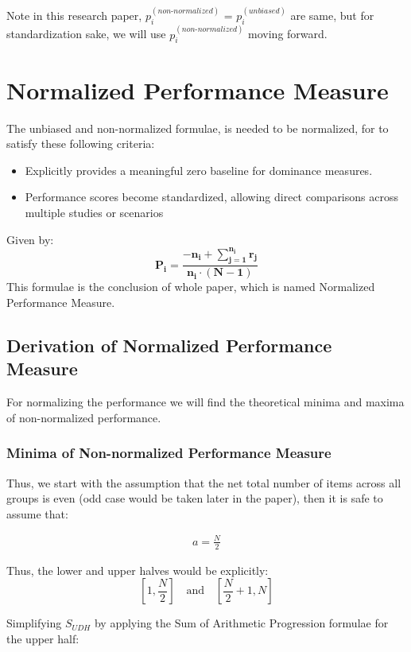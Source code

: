 \documentclass[a4paper,fleqn,review]{cas-sc}
\begin{document}
Note in this research paper, $p_i^{(non\text{-}normalized)}$ = $p_i^{(unbiased)}$ are same, but for standardization sake, we will use $p_i^{(non\text{-}normalized)}$ moving forward.

\section{Normalized Performance Measure}

The unbiased and non-normalized formulae, is needed to be normalized, for to satisfy these following criteria:
\begin{itemize}
	\item Explicitly provides a meaningful zero baseline for dominance measures.
	\item Performance scores become standardized, allowing direct comparisons across multiple studies or scenarios
\end{itemize}
Given by:
\begin{equation}
	\boxed{
		\mathbf{
			P_i = \frac{-n_i +  \sum\limits_{j=1}^{n_i} r_j}{n_i \cdot (N - 1)}}
	}
\end{equation}
This formulae is the conclusion of whole paper, which is named Normalized Performance Measure.

\subsection{Derivation of Normalized Performance Measure}

For normalizing the performance we will find the theoretical minima and maxima of non-normalized performance. 

\subsubsection{Minima of Non-normalized Performance Measure}

Thus, we start with the assumption that the net total number of items across all groups is even (odd case would be taken later in the paper), then it is safe to assume that:

\begin{align*}
	a = \frac{N}{2}
\end{align*}

Thus, the lower and upper halves would be explicitly:
\[
\left[1, \frac{N}{2}\right] \quad \text{and} \quad \left[\frac{N}{2}+1, N\right]
\]

Simplifying $S_{UDH}$ by applying the Sum of Arithmetic Progression formulae for the upper half:
\end{document}
